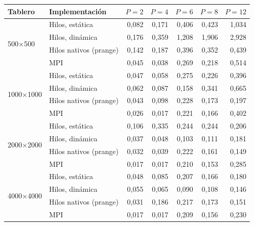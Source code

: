 \begin{tabular}{llrrrrr}
\toprule
Tablero & Implementación & $P=2$ & $P=4$ & $P=6$ & $P=8$ & $P=12$ \\
\midrule
\multirow{4}{*}{500$\times$500} & Hilos, estática & 0,082 & 0,171 & 0,406 & 0,423 & 1,034 \\
 & Hilos, dinámica & 0,176 & 0,359 & 1,208 & 1,906 & 2,928 \\
 & Hilos nativos (prange) & 0,142 & 0,187 & 0,396 & 0,352 & 0,439 \\
 & MPI & 0,045 & 0,038 & 0,269 & 0,218 & 0,514 \\
\midrule
\multirow{4}{*}{1000$\times$1000} & Hilos, estática & 0,047 & 0,058 & 0,275 & 0,226 & 0,396 \\
 & Hilos, dinámica & 0,062 & 0,087 & 0,158 & 0,341 & 0,665 \\
 & Hilos nativos (prange) & 0,043 & 0,098 & 0,228 & 0,173 & 0,197 \\
 & MPI & 0,026 & 0,017 & 0,221 & 0,166 & 0,402 \\
\midrule
\multirow{4}{*}{2000$\times$2000} & Hilos, estática & 0,106 & 0,335 & 0,244 & 0,244 & 0,206 \\
 & Hilos, dinámica & 0,037 & 0,048 & 0,103 & 0,111 & 0,181 \\
 & Hilos nativos (prange) & 0,032 & 0,039 & 0,222 & 0,161 & 0,149 \\
 & MPI & 0,017 & 0,017 & 0,210 & 0,153 & 0,285 \\
\midrule
\multirow{4}{*}{4000$\times$4000} & Hilos, estática & 0,048 & 0,085 & 0,207 & 0,166 & 0,180 \\
 & Hilos, dinámica & 0,055 & 0,065 & 0,090 & 0,108 & 0,146 \\
 & Hilos nativos (prange) & 0,031 & 0,186 & 0,217 & 0,173 & 0,151 \\
 & MPI & 0,017 & 0,017 & 0,209 & 0,156 & 0,230 \\
\bottomrule
\end{tabular}
